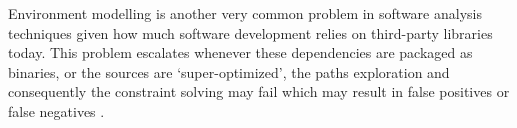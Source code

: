 Environment modelling is another very common problem in software analysis techniques given how much software development relies on third-party libraries today. This problem escalates whenever these dependencies are packaged as binaries, or the sources are `super-optimized', the paths exploration and consequently the constraint solving may fail which may result in false positives or false negatives \cite{Cadar2008}.





